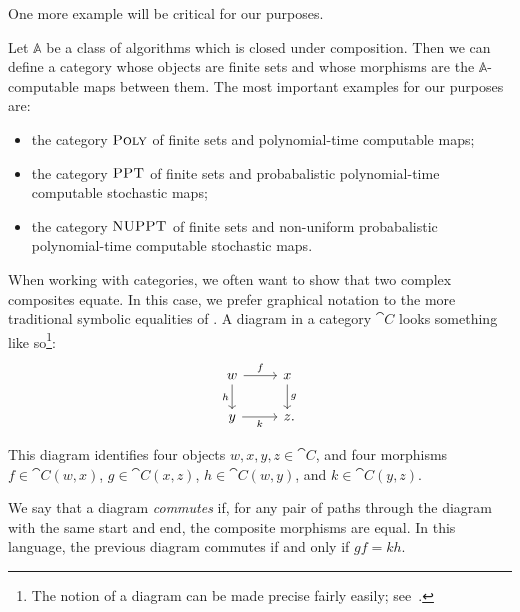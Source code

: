 One more example will be critical for our purposes.

\begin{ex}\label{ex:categories of computable maps}
  Let $\mathbb{A}$ be a class of algorithms which is closed under composition.
  Then we can define a category whose objects are finite sets and whose
  morphisms are the $\mathbb{A}$-computable maps between them.
  The most important examples for our purposes are: \begin{itemize}
    \item the category ${\textsc{\text{Poly}}}$ of finite sets and polynomial-time
      computable maps;
    \item the category ${\textsc{\text{PPT}}}$ of finite sets and probabalistic
      polynomial-time computable stochastic maps;
    \item the category ${\textsc{\text{NUPPT}}}$ of finite sets and non-uniform
      probabalistic polynomial-time computable stochastic maps.
  \end{itemize}
\end{ex}


\noindent
When working with categories, we often want to show that two complex composites
equate. In this case, we prefer graphical notation to the more traditional
symbolic equalities of . A
diagram in a category $\cat{C}$ looks something like so\footnote{
  The notion of a diagram can be made precise fairly easily; see~\cite[subsection 1.6]{riehl-2017}.
}:
\[
  \begin{tikzcd}
    w\ar[r, "f"]\ar[d, "h"'] & x\ar[d, "g"] \\
    y\ar[r, "k"'] & z\punctuation{.}
  \end{tikzcd}
\]

This diagram identifies four objects $w,x,y,z\in\cat{C}$, and four morphisms
$f\in\cat{C}(w, x)$, $g\in\cat{C}(x, z)$, $h\in\cat{C}(w, y)$, and
$k\in\cat{C}(y, z)$.

We say that a diagram \emph{commutes} if, for any pair of paths
through the diagram with the same start and end, the composite morphisms are
equal. In this language, the previous diagram commutes if and only if $gf = kh$.

